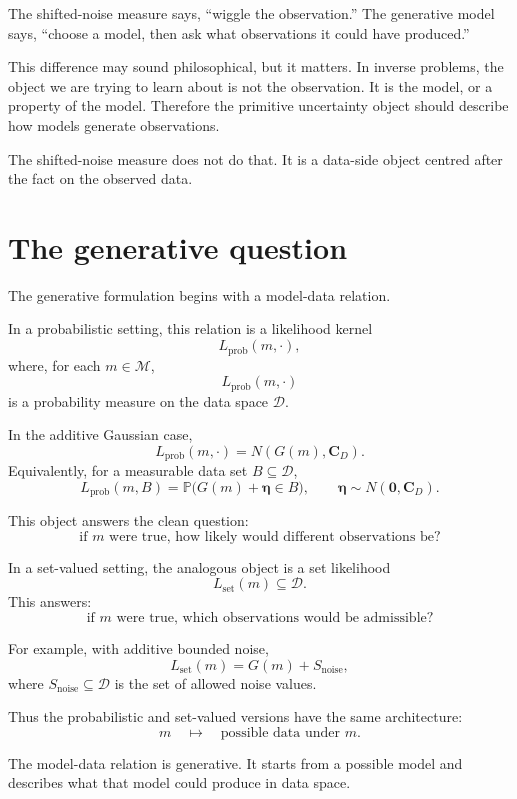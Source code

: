 \documentclass[11pt,openany]{book}
\theoremstyle{definition}
\theoremstyle{remark}
\newcommand{\M}{\mathcal M}
\newcommand{\D}{\mathcal D}
\begin{document}
\begin{intuitionbox}
The shifted-noise measure says, ``wiggle the observation.'' The generative model says,
``choose a model, then ask what observations it could have produced.''
\end{intuitionbox}

This difference may sound philosophical, but it matters. In inverse problems, the object we are
trying to learn about is not the observation. It is the model, or a property of the model. Therefore
the primitive uncertainty object should describe how models generate observations.

The shifted-noise measure does not do that. It is a data-side object centred after the fact on the
observed data.

\section{The generative question}

The generative formulation begins with a model-data relation.

In a probabilistic setting, this relation is a likelihood kernel
\[
  L_{\mathrm{prob}}(m,\cdot),
\]
where, for each \(m\in\M\),
\[
  L_{\mathrm{prob}}(m,\cdot)
\]
is a probability measure on the data space \(\D\).

In the additive Gaussian case,
\[
  L_{\mathrm{prob}}(m,\cdot)
  =
  N(G(m),\mathbf C_D).
\]
Equivalently, for a measurable data set \(B\subseteq\D\),
\[
  L_{\mathrm{prob}}(m,B)
  =
  \mathbb P\bigl(G(m)+\boldsymbol\eta\in B\bigr),
  \qquad
  \boldsymbol\eta\sim N(\mathbf 0,\mathbf C_D).
\]

This object answers the clean question:
\[
  \text{if }m\text{ were true, how likely would different observations be?}
\]

In a set-valued setting, the analogous object is a set likelihood
\[
  L_{\mathrm{set}}(m)\subseteq\D.
\]
This answers:
\[
  \text{if }m\text{ were true, which observations would be admissible?}
\]

For example, with additive bounded noise,
\[
  L_{\mathrm{set}}(m)
  =
  G(m)+S_{\mathrm{noise}},
\]
where \(S_{\mathrm{noise}}\subseteq\D\) is the set of allowed noise values.

Thus the probabilistic and set-valued versions have the same architecture:
\[
  m
  \quad\longmapsto\quad
  \text{possible data under }m.
\]

\begin{lessonbox}
The model-data relation is generative. It starts from a possible model and describes what that
model could produce in data space.
\end{lessonbox}
\end{document}
